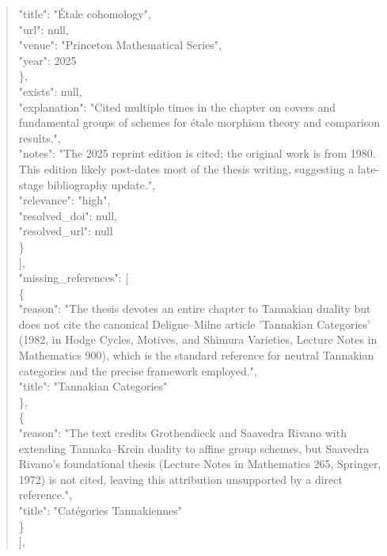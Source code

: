 \documentclass[11pt]{article}
\begin{document}
\begin{quote}
        "title": "Étale cohomology",\\
        "url": null,\\
        "venue": "Princeton Mathematical Series",\\
        "year": 2025\\
      \},\\
      "exists": null,\\
      "explanation": "Cited multiple times in the chapter on covers and fundamental groups of schemes for étale morphism theory and comparison results.",\\
      "notes": "The 2025 reprint edition is cited; the original work is from 1980. This edition likely post-dates most of the thesis writing, suggesting a late-stage bibliography update.",\\
      "relevance": "high",\\
      "resolved\_doi": null,\\
      "resolved\_url": null\\
    \}\\
  ],\\
  "missing\_references": [\\
    \{\\
      "reason": "The thesis devotes an entire chapter to Tannakian duality but does not cite the canonical Deligne--Milne article 'Tannakian Categories' (1982, in Hodge Cycles, Motives, and Shimura Varieties, Lecture Notes in Mathematics 900), which is the standard reference for neutral Tannakian categories and the precise framework employed.",\\
      "title": "Tannakian Categories"\\
    \},\\
    \{\\
      "reason": "The text credits Grothendieck and Saavedra Rivano with extending Tannaka--Krein duality to affine group schemes, but Saavedra Rivano's foundational thesis (Lecture Notes in Mathematics 265, Springer, 1972) is not cited, leaving this attribution unsupported by a direct reference.",\\
      "title": "Catégories Tannakiennes"\\
    \}\\
  ],\\

\end{quote}
\end{document}
